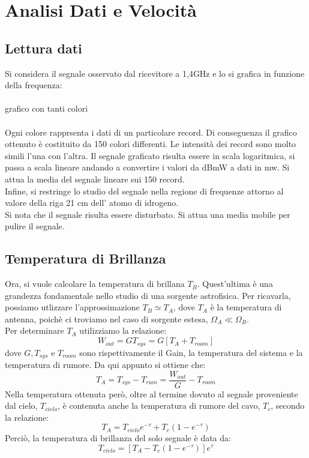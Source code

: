 \section{Analisi Dati e Velocità}
\label{Analisi Dati e Velocità}



\subsection{Lettura dati}
Si considera il segnale osservato dal ricevitore a 1,4GHz e lo si grafica in funzione della frequenza:
\\\\
grafico con tanti colori
\\\\
Ogni colore rapprsenta i dati di un particolare record. Di conseguenza il grafico ottenuto è costituito da 150 colori differenti. Le intensità dei record sono molto simili l'una con l'altra.
Il segnale graficato risulta essere in scala logaritmica, si passa a scala lineare andando a convertire i  valori da dBmW a dati in mw. Si attua la media del segnale lineare sui 150 record.\\
Infine, si restringe lo studio del segnale nella regione di frequenze attorno al valore della riga 21 cm dell' atomo di idrogeno.\\
Si nota che il segnale risulta essere disturbato. Si attua una media mobile per pulire il segnale.


\subsection{Temperatura di Brillanza}
Ora, si vuole calcolare la temperatura di brillana $T_{B}$. Quest'ultima è una grandezza fondamentale nello studio di una sorgente astrofisica. Per ricavarla, possiamo utlizzare l'approssimazione $T_{B} \simeq T_{A}$, dove $T_{A}$ è la temperatura di antenna, poichè ci troviamo nel caso di sorgente estesa, $\Omega_{A} \ll \Omega_{B}$.\\
Per determinare $T_{A}$ utilizziamo la relazione:
\begin{equation}
    W_{out}=GT_{sys}=G[T_{A}+T_{room}]
\end{equation}
dove $G, T_{sys}$ e $T_{room}$ sono rispettivamente il Gain, la temperatura del sistema e la temperatura di rumore.
Da qui appunto si ottiene che:
\begin{equation}
    T_{A}=T_{sys}-T_{rum}=\frac{W_{out}}{G}-T_{room} 
\label{temp antenna}
\end{equation}
Nella temperatura ottenuta però, oltre al termine dovuto al segnale proveniente dal cielo, $T_{cielo}$, è contenuta anche la temperatura di rumore del cavo, $T_{c}$, secondo la relazione:
\begin{equation}
    T_{A}=T_{cielo}e^{-\tau}+T_{c}(1-e^{-\tau})
\end{equation}
Perciò, la temperatura di brillanza del solo segnale è data da:
\begin{equation}
    T_{cielo}=[T_{A}-T_{c}(1-e^{-\tau})]e^{\tau}
\end{equation}

